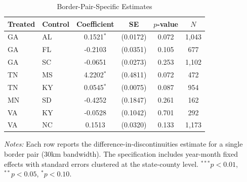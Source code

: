 \begin{table}[htbp]
\centering
\caption{Border-Pair-Specific Estimates}
\label{tab:pairs}
\begin{tabular}{llcccc}
\hline\hline
Treated & Control & Coefficient & SE & $p$-value & $N$ \\
\hline
GA & AL & 0.1521$^{*}$ & (0.0172) & 0.072 & 1,043 \\
GA & FL & -0.2103 & (0.0351) & 0.105 & 677 \\
GA & SC & -0.0651 & (0.0273) & 0.253 & 1,102 \\
TN & MS & 4.2202$^{*}$ & (0.4811) & 0.072 & 472 \\
TN & KY & 0.0545$^{*}$ & (0.0075) & 0.087 & 954 \\
MN & SD & -0.4252 & (0.1847) & 0.261 & 162 \\
VA & KY & -0.0528 & (0.1042) & 0.701 & 292 \\
VA & NC & 0.1513 & (0.0320) & 0.133 & 1,173 \\
\hline\hline
\end{tabular}
\begin{tablenotes}
\item \textit{Notes:} Each row reports the difference-in-discontinuities estimate for a single border pair (30km bandwidth). The specification includes year-month fixed effects with standard errors clustered at the state-county level. $^{***}p<0.01$, $^{**}p<0.05$, $^{*}p<0.10$.
\end{tablenotes}
\end{table}

